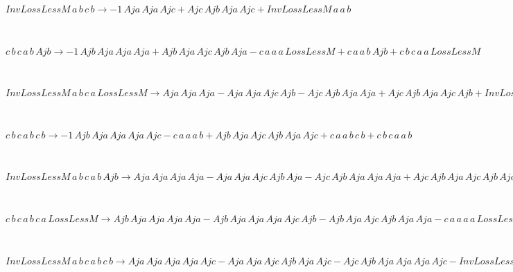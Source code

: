 \documentclass[rep10,leqno]{report}
\begin{document}
\begin{minipage}{6in}
$
InvLossLessM\,
 a\,
 b\,
 c\,
 b\rightarrow -1\,
 Aja\,
 Aja\,
 Ajc + Ajc\,
 Ajb\,
 Aja\,
 Ajc + InvLossLessM\,
 a\,
 a\,
 b
$
\end{minipage}\medskip \\
\begin{minipage}{6in}
$
c\,
 b\,
 c\,
 a\,
 b\,
 Ajb\rightarrow -1\,
 Ajb\,
 Aja\,
 Aja\,
 Aja + Ajb\,
 Aja\,
 Ajc\,
 Ajb\,
 Aja - c\,
 a\,
 a\,
 a\,
 LossLessM + c\,
 a\,
 a\,
 b\,
 Ajb + c\,
 b\,
 c\,
 a\,
 a\,
 LossLessM
$
\end{minipage}\medskip \\
\begin{minipage}{6in}
$
InvLossLessM\,
 a\,
 b\,
 c\,
 a\,
 LossLessM\rightarrow Aja\,
 Aja\,
 Aja - Aja\,
 Aja\,
 Ajc\,
 Ajb - Ajc\,
 Ajb\,
 Aja\,
 Aja + Ajc\,
 Ajb\,
 Aja\,
 Ajc\,
 Ajb + InvLossLessM\,
 a\,
 a\,
 a\,
 LossLessM
$
\end{minipage}\medskip \\
\begin{minipage}{6in}
$
c\,
 b\,
 c\,
 a\,
 b\,
 c\,
 b\rightarrow -1\,
 Ajb\,
 Aja\,
 Aja\,
 Aja\,
 Ajc - c\,
 a\,
 a\,
 a\,
 b + Ajb\,
 Aja\,
 Ajc\,
 Ajb\,
 Aja\,
 Ajc + c\,
 a\,
 a\,
 b\,
 c\,
 b + c\,
 b\,
 c\,
 a\,
 a\,
 b
$
\end{minipage}\medskip \\
\begin{minipage}{6in}
$
InvLossLessM\,
 a\,
 b\,
 c\,
 a\,
 b\,
 Ajb\rightarrow Aja\,
 Aja\,
 Aja\,
 Aja - Aja\,
 Aja\,
 Ajc\,
 Ajb\,
 Aja - Ajc\,
 Ajb\,
 Aja\,
 Aja\,
 Aja + Ajc\,
 Ajb\,
 Aja\,
 Ajc\,
 Ajb\,
 Aja - InvLossLessM\,
 a\,
 a\,
 a\,
 a\,
 LossLessM + InvLossLessM\,
 a\,
 a\,
 a\,
 b\,
 Ajb + InvLossLessM\,
 a\,
 b\,
 c\,
 a\,
 a\,
 LossLessM
$
\end{minipage}\medskip \\
\begin{minipage}{6in}
$
c\,
 b\,
 c\,
 a\,
 b\,
 c\,
 a\,
 LossLessM\rightarrow Ajb\,
 Aja\,
 Aja\,
 Aja\,
 Aja - Ajb\,
 Aja\,
 Aja\,
 Aja\,
 Ajc\,
 Ajb - Ajb\,
 Aja\,
 Ajc\,
 Ajb\,
 Aja\,
 Aja - c\,
 a\,
 a\,
 a\,
 a\,
 LossLessM + Ajb\,
 Aja\,
 Ajc\,
 Ajb\,
 Aja\,
 Ajc\,
 Ajb + c\,
 a\,
 a\,
 b\,
 c\,
 a\,
 LossLessM + c\,
 b\,
 c\,
 a\,
 a\,
 a\,
 LossLessM
$
\end{minipage}\medskip \\
\begin{minipage}{6in}
$
InvLossLessM\,
 a\,
 b\,
 c\,
 a\,
 b\,
 c\,
 b\rightarrow Aja\,
 Aja\,
 Aja\,
 Aja\,
 Ajc - Aja\,
 Aja\,
 Ajc\,
 Ajb\,
 Aja\,
 Ajc - Ajc\,
 Ajb\,
 Aja\,
 Aja\,
 Aja\,
 Ajc - InvLossLessM\,
 a\,
 a\,
 a\,
 a\,
 b + Ajc\,
 Ajb\,
 Aja\,
 Ajc\,
 Ajb\,
 Aja\,
 Ajc + InvLossLessM\,
 a\,
 a\,
 a\,
 b\,
 c\,
 b + InvLossLessM\,
 a\,
 b\,
 c\,
 a\,
 a\,
 b
$
\end{minipage}\medskip \\
\end{document}
